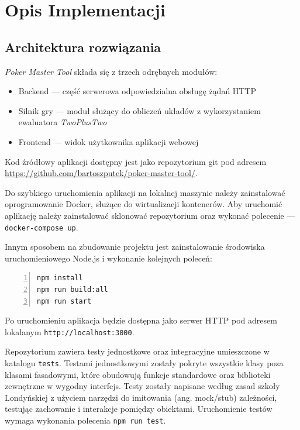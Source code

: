 \chapter{Opis Implementacji}
\label{chapter:4}

\section{Architektura rozwiązania}

\emph{Poker Master Tool} składa się z trzech odrębnych modułów:
\begin{itemize}
    \item Backend --- część serwerowa odpowiedzialna obsługę żądań HTTP
    \item Silnik gry --- moduł służący do obliczeń układów z wykorzystaniem ewaluatora \emph{TwoPlusTwo}
    \item Frontend --- widok użytkownika aplikacji webowej
\end{itemize}

Kod źródłowy aplikacji dostępny jest jako repozytorium git pod adresem \\ \href{https://github.com/bartoszputek/poker-master-tool/}{https://github.com/bartoszputek/poker-master-tool/}.

Do szybkiego uruchomienia aplikacji na lokalnej maszynie należy zainstalować oprogramowanie Docker, służące do wirtualizacji kontenerów. Aby uruchomić aplikację należy zainstalować sklonować repozytorium oraz wykonać polecenie ---
\verb+docker-compose up+.

Innym sposobem na zbudowanie projektu jest zainstalowanie środowiska uruchomieniowego Node.js i wykonanie kolejnych poleceń:

\begin{Verbatim}[numbers=left,xleftmargin=5mm, frame=single]
npm install 
npm run build:all
npm run start
\end{Verbatim}

Po uruchomieniu aplikacja będzie dostępna jako serwer HTTP pod adresem lokalanym \verb+http://localhost:3000+.

Repozytorium zawiera testy jednostkowe oraz integracyjne umieszczone w katalogu \verb+tests+. Testami jednostkowymi zostały pokryte wszystkie klasy poza klasami fasadowymi, które obudowują funkcje standardowe oraz biblioteki zewnętrzne w wygodny interfejs. Testy zostały napisane według zasad szkoły Londyńskiej \cite{mocks-arent-stubs} z użyciem narzędzi do imitowania (ang. mock/stub) zależności, testując zachowanie i interakcje pomiędzy obiektami. Uruchomienie testów wymaga wykonania polecenia \verb+npm run test+.

